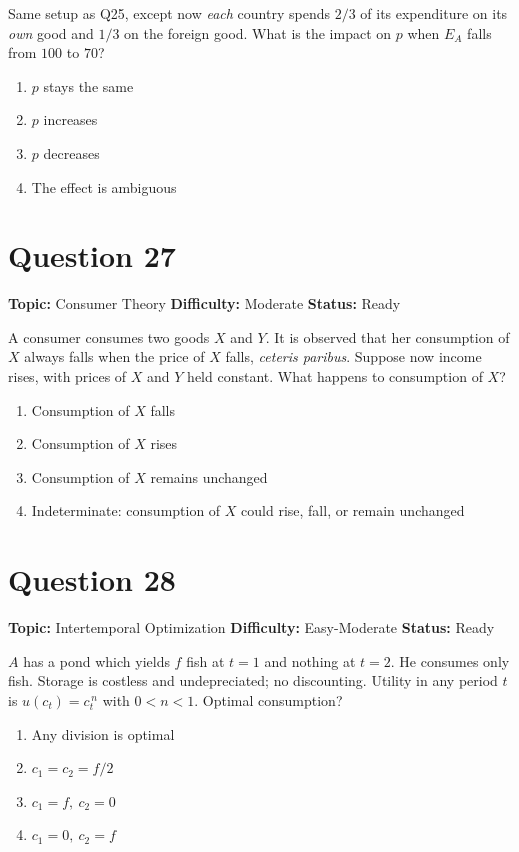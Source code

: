 \documentclass[11pt]{article}
\begin{document}
Same setup as Q25, except now \emph{each} country spends $2/3$ of its expenditure on its \emph{own} good and $1/3$ on the foreign good. What is the impact on $p$ when $E_A$ falls from $100$ to $70$?
\begin{enumerate}[label=(\Alph*)]
\item $p$ stays the same
\item $p$ increases
\item $p$ decreases
\item The effect is ambiguous
\end{enumerate}

\newpage

\section*{Question 27}


\noindent\textbf{Topic:} Consumer Theory \quad \textbf{Difficulty:} Moderate \quad \textbf{Status:} Ready



A consumer consumes two goods $X$ and $Y$. It is observed that her consumption of $X$ always falls when the price of $X$ falls, \emph{ceteris paribus}. Suppose now income rises, with prices of $X$ and $Y$ held constant. What happens to consumption of $X$?
\begin{enumerate}[label=(\Alph*)]
\item Consumption of $X$ falls
\item Consumption of $X$ rises
\item Consumption of $X$ remains unchanged
\item Indeterminate: consumption of $X$ could rise, fall, or remain unchanged
\end{enumerate}

\newpage

\section*{Question 28}


\noindent\textbf{Topic:} Intertemporal Optimization \quad \textbf{Difficulty:} Easy-Moderate \quad \textbf{Status:} Ready



$A$ has a pond which yields $f$ fish at $t=1$ and nothing at $t=2$. He consumes only fish. Storage is costless and undepreciated; no discounting. Utility in any period $t$ is $u(c_t)=c_t^{\,n}$ with $0<n<1$. Optimal consumption?
\begin{enumerate}[label=(\Alph*)]
\item Any division is optimal
\item $c_1=c_2=f/2$
\item $c_1=f,\ c_2=0$
\item $c_1=0,\ c_2=f$
\end{enumerate}
\end{document}
